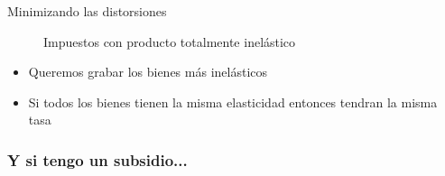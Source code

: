 \documentclass{beamer}
\begin{document}
\begin{frame}{Minimizando las distorsiones}

\begin{figure} [H]
\caption{Impuestos con producto totalmente inelástico}
    \centering
{}
\label{fig:20.1}
\end{figure} 

\begin{itemize}
    \item Queremos grabar los bienes más inelásticos
    \item Si todos los bienes tienen la misma elasticidad entonces tendran la misma tasa
\end{itemize}
\end{frame}

\begin{frame}
\frametitle{Y si tengo un subsidio...}

\end{frame}
\end{document}
